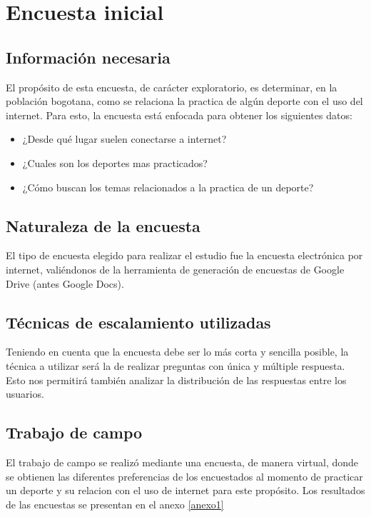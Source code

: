\section{Encuesta inicial}

\subsection{Información necesaria}

El propósito de esta encuesta, de carácter exploratorio, es determinar, en la población bogotana, como se relaciona la practica de algún deporte con el uso del internet.
Para esto, la encuesta está enfocada para obtener los siguientes datos:
\begin{itemize}
  \item ¿Desde qué lugar suelen conectarse a internet?
  \item ¿Cuales son los deportes mas practicados?
  \item ¿Cómo buscan los temas relacionados a la practica de un deporte?
\end{itemize}

\subsection{Naturaleza de la encuesta}

El tipo de encuesta elegido para realizar el estudio fue la encuesta electrónica por internet, valiéndonos de la herramienta de generación de encuestas de Google Drive (antes Google Docs).

\subsection{Técnicas de escalamiento utilizadas}

Teniendo en cuenta que la encuesta debe ser lo más corta y sencilla posible, la técnica a utilizar será la de realizar preguntas con única y múltiple respuesta. Esto nos permitirá también analizar la distribución de las respuestas entre los usuarios.


\subsection{Trabajo de campo}

El trabajo de campo se realizó mediante una encuesta, de manera virtual, donde se obtienen las diferentes preferencias de los encuestados al momento de practicar un deporte y su relacion con el uso de internet para este propósito.
Los resultados de las encuestas se presentan en el anexo \ref{anexo1}

